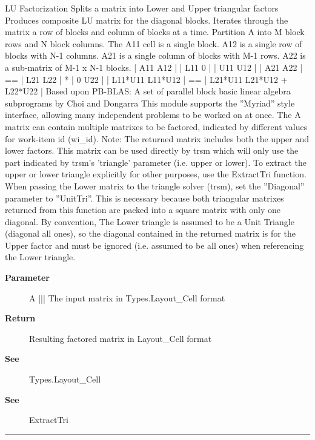 \par
LU Factorization Splits a matrix into Lower and Upper triangular factors Produces composite LU matrix for the diagonal blocks. Iterates through the matrix a row of blocks and column of blocks at a time. Partition A into M block rows and N block columns. The A11 cell is a single block. A12 is a single row of blocks with N-1 columns. A21 is a single column of blocks with M-1 rows. A22 is a sub-matrix of M-1 x N-1 blocks. | A11 A12 | | L11 0 | | U11 U12 | | A21 A22 | == | L21 L22 | * | 0 U22 | | L11*U11 L11*U12 | == | L21*U11 L21*U12 + L22*U22 | Based upon PB-BLAS: A set of parallel block basic linear algebra subprograms by Choi and Dongarra This module supports the ''Myriad'' style interface, allowing many independent problems to be worked on at once. The A matrix can contain multiple matrixes to be factored, indicated by different values for work-item id (wi\_id). Note: The returned matrix includes both the upper and lower factors. This matrix can be used directly by trsm which will only use the part indicated by trsm's 'triangle' parameter (i.e. upper or lower). To extract the upper or lower triangle explicitly for other purposes, use the ExtractTri function. When passing the Lower matrix to the triangle solver (trsm), set the ''Diagonal'' parameter to ''UnitTri''. This is necessary because both triangular matrixes returned from this function are packed into a square matrix with only one diagonal. By convention, The Lower triangle is assumed to be a Unit Triangle (diagonal all ones), so the diagonal contained in the returned matrix is for the Upper factor and must be ignored (i.e. assumed to be all ones) when referencing the Lower triangle.

\par
\begin{description}
\item [\textbf{Parameter}] A ||| The input matrix in Types.Layout\_Cell format
\item [\textbf{Return}] Resulting factored matrix in Layout\_Cell format
\item [\textbf{See}] Types.Layout\_Cell
\item [\textbf{See}] ExtractTri
\end{description}

\rule{\textwidth}{0.4pt}
